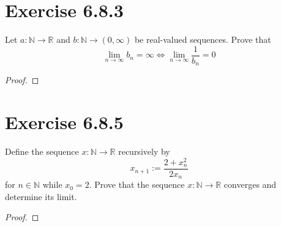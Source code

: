 \documentclass{article}
\newcommand{\N}{\mathbb{N}}
\newcommand{\R}{\mathbb{R}}
\theoremstyle{mytheoremstyle}
\theoremstyle{mytheoremstyle}
\theoremstyle{myproblemstyle}
\begin{document}
    \section{Exercise 6.8.3}
    \begin{problem}
        Let $a: \N \to \R$ and $b: \N \to (0,\infty)$ be real-valued sequences. Prove that
        $$\lim_{n\to\infty}b_n = \infty \iff \lim_{n\to\infty}\frac{1}{b_n} = 0$$
    \end{problem}
    \begin{proof}
    \end{proof}

    \section{Exercise 6.8.5}
    \begin{problem}
        Define the sequence $x: \N \to \R$ recursively by 
        $$x_{n+1} := \frac{2+x_n^2}{2x_n}$$
        for $n \in \N$ while $x_0 = 2$. Prove that the sequence $x: \N \to \R$ converges and determine its limit.
    \end{problem}
    \begin{proof}
    \end{proof}
\end{document}
